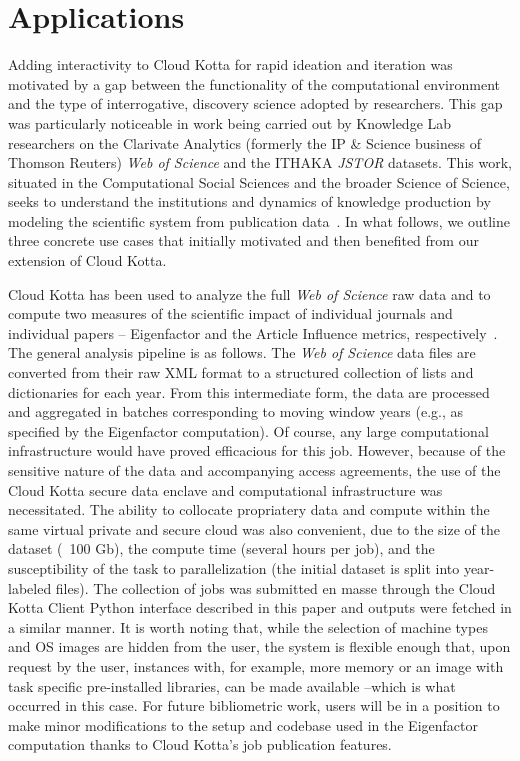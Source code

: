 \section{Applications}

Adding interactivity to Cloud Kotta for rapid ideation and iteration was motivated by a gap between the functionality of the computational environment and the type of interrogative, discovery science adopted by researchers. This gap was particularly noticeable in work being carried out by Knowledge Lab researchers on the Clarivate Analytics (formerly the IP \& Science business of Thomson Reuters) {\it Web of Science} and the ITHAKA {\it JSTOR} datasets. This work, situated in the Computational Social Sciences and the broader Science of Science, seeks to understand the institutions and dynamics of knowledge production by modeling the scientific system from publication data~\cite{evans2011metaknowledge}. In what follows, we outline three concrete use cases that initially motivated and then benefited from our extension of Cloud Kotta.

Cloud Kotta has been used to analyze the full {\it Web of Science} raw data and to compute two measures of the scientific impact of individual journals and individual papers -- Eigenfactor and the Article Influence metrics, respectively~\cite{bergstrom2008eigenfactor}. The general analysis pipeline is as follows. The {\it Web of Science} data files are converted from their raw XML format to a structured collection of lists and dictionaries for each year. From this intermediate form, the data are processed and
aggregated in batches corresponding to moving window years (e.g., as specified by the Eigenfactor computation). 
Of course, any large computational infrastructure would have proved efficacious for this job. However, because of the sensitive nature of the data and accompanying access agreements, the use of the Cloud Kotta secure data enclave and computational infrastructure was necessitated. The ability to collocate propriatery data and compute within the same virtual private and secure cloud was also convenient, due to the size of the dataset (~100 Gb), the compute time (several hours per job), and the susceptibility of the task to parallelization (the initial dataset is split into year-labeled files). The collection of jobs was submitted en masse through the Cloud Kotta Client Python interface described in this paper and outputs were fetched in a similar manner. It is worth noting that, while the selection of machine types and OS images are hidden from the user, the system is
flexible enough that, upon request by the user, instances with, for example, more memory or an image with task specific
pre-installed libraries, can be made available --which is what occurred in this case. For future bibliometric work, users will be in a position to make minor modifications to the setup and codebase used in the Eigenfactor computation thanks to Cloud Kotta's job publication features.

